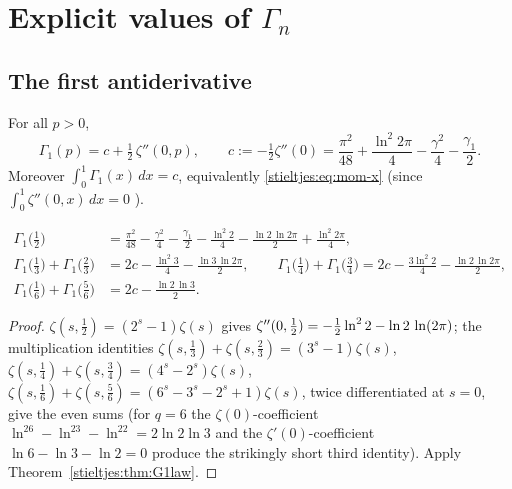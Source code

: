 \section{Explicit values of \texorpdfstring{$\Gamma_{\!n}$}{Gamma\_n}}
\label{stieltjes:sec:values}

\subsection{The first antiderivative}

\begin{theorem}\label{stieltjes:thm:G1law}
For all $p>0$,
\[
\Gamma_{\!1}(p)=c+\tfrac12\,\zeta''(0,p),
\qquad
c:=-\tfrac12\zeta''(0)
=\frac{\pi^2}{48}+\frac{\ln^2 2\pi}{4}-\frac{\gamma^2}{4}-\frac{\gamma_1}{2}.
\]
Moreover $\int_0^1\Gamma_{\!1}(x)\,dx=c$, equivalently
\eqref{stieltjes:eq:mom-x} (since $\int_0^1\zeta''(0,x)\,dx=0$
\cite{bridge:Deninger,stieltjes:Coffey}).
\end{theorem}

\begin{theorem}\label{stieltjes:thm:G1half}
\begin{align*}
\Gamma_{\!1}\bigl(\tfrac12\bigr)
&=\frac{\pi^2}{48}-\frac{\gamma^2}{4}-\frac{\gamma_1}{2}
-\frac{\ln^2 2}{4}-\frac{\ln 2\,\ln 2\pi}{2}+\frac{\ln^2 2\pi}{4},\\
\Gamma_{\!1}\bigl(\tfrac13\bigr)+\Gamma_{\!1}\bigl(\tfrac23\bigr)
&=2c-\frac{\ln^2 3}{4}-\frac{\ln 3\,\ln 2\pi}{2},\qquad
\Gamma_{\!1}\bigl(\tfrac14\bigr)+\Gamma_{\!1}\bigl(\tfrac34\bigr)
=2c-\frac{3\ln^2 2}{4}-\frac{\ln 2\,\ln 2\pi}{2},\\
\Gamma_{\!1}\bigl(\tfrac16\bigr)+\Gamma_{\!1}\bigl(\tfrac56\bigr)
&=2c-\frac{\ln 2\,\ln 3}{2}.
\end{align*}
\end{theorem}

\begin{proof}
$\zeta(s,\tfrac12)=(2^s-1)\zeta(s)$ gives
$\zeta''(0,\tfrac12)=-\tfrac12\ln^22-\ln2\,\ln(2\pi)$; the multiplication
identities $\zeta(s,\tfrac13)+\zeta(s,\tfrac23)=(3^s-1)\zeta(s)$,
$\zeta(s,\tfrac14)+\zeta(s,\tfrac34)=(4^s-2^s)\zeta(s)$,
$\zeta(s,\tfrac16)+\zeta(s,\tfrac56)=(6^s-3^s-2^s+1)\zeta(s)$, twice
differentiated at $s=0$, give the even sums (for $q=6$ the
$\zeta(0)$-coefficient $\ln^26-\ln^23-\ln^22=2\ln2\ln3$ and the
$\zeta'(0)$-coefficient $\ln6-\ln3-\ln2=0$ produce the strikingly short
third identity). Apply Theorem~\ref{stieltjes:thm:G1law}.
\end{proof}

